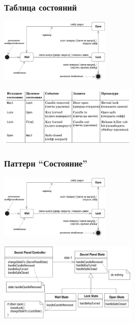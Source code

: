 \documentclass{../../slides-style}
\begin{document}
    \begin{frame}
        \frametitle{Таблица состояний}
        \begin{center}
            \includegraphics[width=0.4\textwidth]{stateTransitionSyntax.png}
        \end{center}

        \begin{center}
            \includegraphics[width=0.5\textwidth]{stateTransitionStateTable.png}
        \end{center}
    \end{frame}

    \begin{frame}
        \frametitle{Паттерн ``Состояние''}
        \begin{center}
            \includegraphics[width=0.4\textwidth]{stateTransitionSyntax.png}
        \end{center}

        \begin{center}
            \includegraphics[width=0.5\textwidth]{stateTransitionStatePattern.png}
        \end{center}
    \end{frame}
\end{document}
